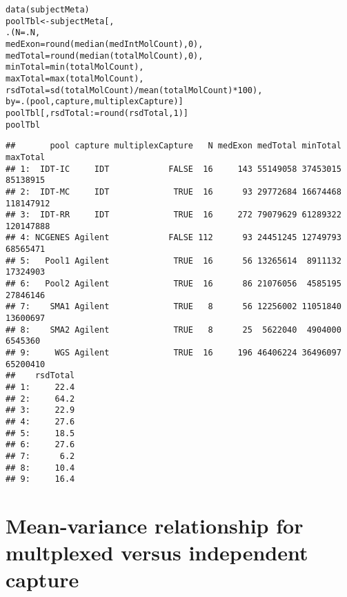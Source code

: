 \documentclass{article}\usepackage[]{graphicx}\usepackage[]{color}
\makeatletter
\newcommand{\hlnum}[1]{\textcolor[rgb]{0.063,0.58,0.627}{#1}}%
\newcommand{\hlopt}[1]{\textcolor[rgb]{0.196,0.196,0.196}{#1}}%
\newcommand{\hlstd}[1]{\textcolor[rgb]{0.196,0.196,0.196}{#1}}%
\newcommand{\hlkwb}[1]{\textcolor[rgb]{0.627,0,0.314}{#1}}%
\newcommand{\hlkwc}[1]{\textcolor[rgb]{0,0.631,0.314}{#1}}%
\newcommand{\hlkwd}[1]{\textcolor[rgb]{0.78,0.227,0.412}{#1}}%
\newenvironment{kframe}{%
 \def\at@end@of@kframe{}%
 \ifinner\ifhmode%
  \def\at@end@of@kframe{\end{minipage}}%
  \begin{minipage}{\columnwidth}%
 \fi\fi%
 \def\FrameCommand##1{\hskip\@totalleftmargin \hskip-\fboxsep
 \colorbox{shadecolor}{##1}\hskip-\fboxsep
     \hskip-\linewidth \hskip-\@totalleftmargin \hskip\columnwidth}%
 \MakeFramed {\advance\hsize-\width
   \@totalleftmargin\z@ \linewidth\hsize
   \@setminipage}}%
 {\par\unskip\endMakeFramed%
 \at@end@of@kframe}
\newenvironment{knitrout}{}{} %
\makeatother
\begin{document}
\begin{knitrout}
\color{fgcolor}\begin{kframe}
\begin{alltt}
\hlkwd{data}\hlstd{(subjectMeta)}
\hlstd{poolTbl} \hlkwb{<-} \hlstd{subjectMeta[ ,}
                       \hlkwd{.}\hlstd{(}\hlkwc{N} \hlstd{= .N,}
                         \hlkwc{medExon} \hlstd{=} \hlkwd{round}\hlstd{(}\hlkwd{median}\hlstd{(medIntMolCount),} \hlnum{0}\hlstd{),}
                         \hlkwc{medTotal} \hlstd{=} \hlkwd{round}\hlstd{(}\hlkwd{median}\hlstd{(totalMolCount),} \hlnum{0}\hlstd{),}
                         \hlkwc{minTotal} \hlstd{=} \hlkwd{min}\hlstd{(totalMolCount),}
                         \hlkwc{maxTotal} \hlstd{=} \hlkwd{max}\hlstd{(totalMolCount),}
                         \hlkwc{rsdTotal} \hlstd{=} \hlkwd{sd}\hlstd{(totalMolCount)}\hlopt{/}\hlkwd{mean}\hlstd{(totalMolCount)}\hlopt{*}\hlnum{100}\hlstd{),}
                       \hlkwc{by} \hlstd{=} \hlkwd{.}\hlstd{(pool, capture, multiplexCapture)]}
\hlstd{poolTbl[ , rsdTotal} \hlkwb{:=} \hlkwd{round}\hlstd{(rsdTotal,} \hlnum{1}\hlstd{)]}
\hlstd{poolTbl}
\end{alltt}
\begin{verbatim}
##       pool capture multiplexCapture   N medExon medTotal minTotal  maxTotal
## 1:  IDT-IC     IDT            FALSE  16     143 55149058 37453015  85138915
## 2:  IDT-MC     IDT             TRUE  16      93 29772684 16674468 118147912
## 3:  IDT-RR     IDT             TRUE  16     272 79079629 61289322 120147888
## 4: NCGENES Agilent            FALSE 112      93 24451245 12749793  68565471
## 5:   Pool1 Agilent             TRUE  16      56 13265614  8911132  17324903
## 6:   Pool2 Agilent             TRUE  16      86 21076056  4585195  27846146
## 7:    SMA1 Agilent             TRUE   8      56 12256002 11051840  13600697
## 8:    SMA2 Agilent             TRUE   8      25  5622040  4904000   6545360
## 9:     WGS Agilent             TRUE  16     196 46406224 36496097  65200410
##    rsdTotal
## 1:     22.4
## 2:     64.2
## 3:     22.9
## 4:     27.6
## 5:     18.5
## 6:     27.6
## 7:      6.2
## 8:     10.4
## 9:     16.4
\end{verbatim}
\end{kframe}
\end{knitrout}

\newpage
\section{Mean-variance relationship for multplexed versus independent capture}
\end{document}

